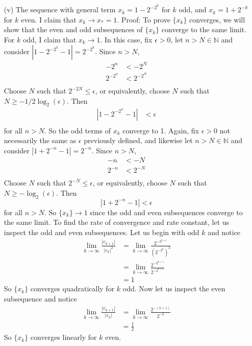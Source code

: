 \documentclass{article}
\begin{document}
\begin{itemize}
    \item[(v)] The sequence with general term $x_k = 1 - 2^{-2^k}$ for $k$ odd, and $x_k = 1 + 2^{-k}$ for $k$ even.
    \newline\newline
    I claim that $x_k \to x_* = 1$. 
    \newline
    Proof: To prove $\{x_k\}$ converges, we will show that the even and odd subsequences of $\{x_k\}$ converge to the same limit. For $k$ odd, I claim that $x_k \to 1$. In this case, fix $\epsilon > 0$, let $n > N \in \mathbb{N}$ and consider $|1 - 2^{-2^k} - 1| = 2^{-2^k}$. Since $n > N$,
    \begin{align*}
        -2^n &< -2^N \\
        2^{-2^n} &< 2^{-2^N} \\
    \end{align*}
    Choose $N$ such that $2^{-2N} \leq \epsilon$, or equivalently, choose $N$ such that $N \geq -1/2\log_2(\epsilon)$. Then
    \begin{align*}
        |1 - 2^{-2^n} - 1| &< \epsilon \\
    \end{align*}
    for all $n > N$. So the odd terms of $x_k$ converge to 1. Again, fix $\epsilon > 0$ not necessarily the same as $\epsilon$ previously defined, and likewise let $n > N \in \mathbb{N}$ and consider $|1 + 2^{-n} - 1| = 2^{-n}$. Since $n > N$,
    \begin{align*}
        -n &< -N \\
        2^{-n} &< 2^{-N} \\
    \end{align*}
    Choose $N$ such that $2^{-N} \leq \epsilon$, or equivalently, choose $N$ such that $N \geq -\log_2(\epsilon)$. Then
    \[|1 + 2^{-n} - 1| < \epsilon\]
    for all $n > N$. So $\{x_k\} \to 1$ since the odd and even subsequences converge to the same limit.
    \newline\newline
    To find the rate of convergence and rate constant, let us inspect the odd and even subsequences. Let us begin with odd $k$ and notice
    \begin{align*}
        \lim_{k\to\infty}\frac{|e_{k+1}|}{|e_k|^2} &= \lim_{k\to\infty}\frac{2^{-2^{k+1}}}{(2^{-2^k})^2} \\
        &= \lim_{k\to\infty} \frac{2^{-2^{k+1}}}{2^{-2^{k+1}}} \\
        &= 1
    \end{align*}
    So $\{x_k\}$ converges quadratically for $k$ odd. Now let us inspect the even subsequence and notice
    \begin{align*}
        \lim_{k\to\infty} \frac{|e_{k+1}|}{|e_k|} &= \lim_{k\to\infty} \frac{2^{-(k+1)}}{2^{-k}} \\
        &= \frac{1}{2}
    \end{align*}
    So $\{x_k\}$ converges linearly for $k$ even. 

    \end{itemize}
\end{document}
